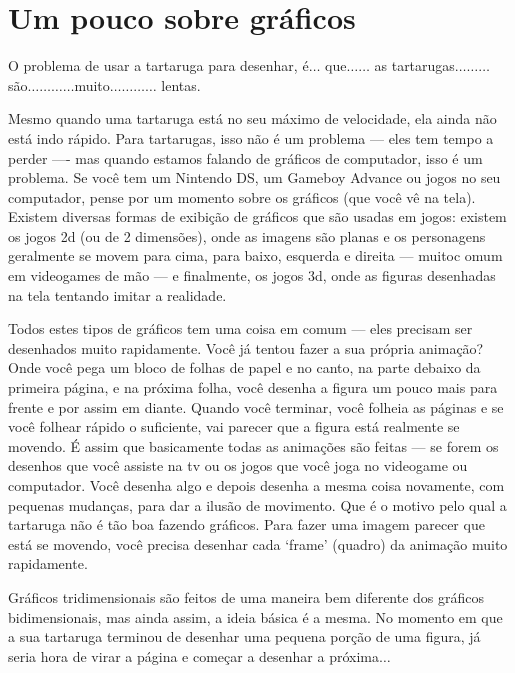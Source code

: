 

\chapter{Um pouco sobre gráficos}\label{ch:abitgraphic}

O problema de usar a tartaruga para desenhar, é$\ldots$ que$\ldots$$\ldots$ as tartarugas$\ldots$$\ldots$$\ldots$ são$\ldots$$\ldots$$\ldots$$\ldots$muito$\ldots$$\ldots$$\ldots$$\ldots$ lentas.
\par
Mesmo quando uma tartaruga está no seu máximo de velocidade, ela ainda não está indo rápido. Para tartarugas, isso não é um problema --- eles tem tempo a perder ---- mas quando estamos falando de gráficos de computador, isso é um problema. Se você tem um Nintendo DS, um Gameboy Advance ou jogos no seu computador, pense por um momento sobre os gráficos (que você vê na tela). Existem diversas formas de exibição de gráficos que são usadas em jogos: existem os jogos 2d (ou de 2 dimensões), onde as imagens são planas e os personagens geralmente se movem para cima, para baixo, esquerda e direita --- muitoc omum em videogames de mão --- e finalmente, os jogos 3d, onde as figuras desenhadas na tela tentando imitar a realidade.

Todos estes tipos de gráficos tem uma coisa em comum --- eles precisam ser desenhados muito rapidamente. Você já tentou fazer a sua própria animação? Onde você pega um bloco de folhas de papel e no canto, na parte debaixo da primeira página, e na próxima folha, você desenha a figura um pouco mais para frente e por assim em diante. Quando você terminar, você folheia as páginas e se você folhear rápido o suficiente, vai parecer que a figura está realmente se movendo. É assim que basicamente todas as animações são feitas --- se forem os desenhos que você assiste na tv ou os jogos que você joga no videogame ou computador. Você desenha algo e depois desenha a mesma coisa novamente, com pequenas mudanças, para dar a ilusão de movimento. Que é o motivo pelo qual a tartaruga não é tão boa fazendo gráficos. Para fazer uma imagem parecer que está se movendo, você precisa desenhar cada `frame' (quadro) da animação muito rapidamente.
\par
Gráficos tridimensionais são feitos de uma maneira bem diferente dos gráficos bidimensionais, mas ainda assim, a ideia básica é a mesma. No momento em que a sua tartaruga terminou de desenhar uma pequena porção de uma figura, já seria hora de virar a página e começar a desenhar a próxima$\ldots$

